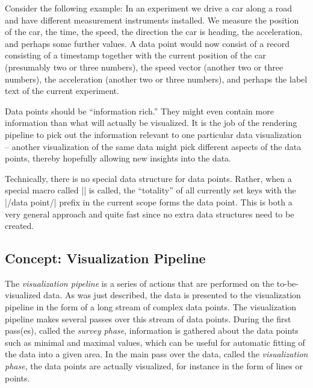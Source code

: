 Consider the following example: In an experiment we drive a car along
a road and have different measurement instruments installed. We
measure the position of the car, the time, the speed, the direction
the car is heading, the acceleration, and perhaps some further
values. A data point would now consist of a record consisting of a
timestamp together with the current position of the car (presumably
two or three numbers), the speed vector (another two or three
numbers), the acceleration (another two or three numbers), and perhaps
the label text of the current experiment. 

Data points should be ``information rich.'' They might even contain
more information than what will actually be visualized. It is the job
of the rendering pipeline to pick out the information relevant to one
particular data visualization -- another visualization of the same
data might pick different aspects of the data points, thereby
hopefully allowing new insights into the data.

Technically, there is no special data structure for data
points. Rather, when a special macro called |\pgfdatapoint| is called,
the ``totality'' of all currently set keys with the |/data point/|
prefix in the current scope forms the data point. This is both a very
general approach and quite fast since no extra data structures need to
be created. 


\subsection{Concept: Visualization Pipeline}

The \emph{visualization pipeline} is a series of actions that are
performed on the to-be-visualized data. As was just described, the
data is presented to the visualization pipeline in the form of a long
stream of  complex data points. The visualization pipeline makes
several passes over this stream of data points. During the first
pass(es), called the \emph{survey phase}, information is gathered
about the data points such as minimal and maximal values, which can be
useful for automatic fitting of the data into a given area. In the
main pass over the data, called the \emph{visualization phase}, the
data points are actually visualized, for instance in the form of lines
or points. 

